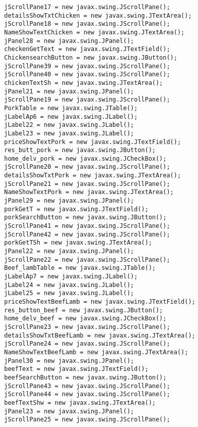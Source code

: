 \documentclass[12pt,a4paper]{article}
\begin{document}
\begin{lstlisting}
        jScrollPane17 = new javax.swing.JScrollPane();
        detailsShowTxtChicken = new javax.swing.JTextArea();
        jScrollPane18 = new javax.swing.JScrollPane();
        NameShowTextChicken = new javax.swing.JTextArea();
        jPanel28 = new javax.swing.JPanel();
        checkenGetText = new javax.swing.JTextField();
        ChickensearchButton = new javax.swing.JButton();
        jScrollPane39 = new javax.swing.JScrollPane();
        jScrollPane40 = new javax.swing.JScrollPane();
        chickenTextSh = new javax.swing.JTextArea();
        jPanel21 = new javax.swing.JPanel();
        jScrollPane19 = new javax.swing.JScrollPane();
        PorkTable = new javax.swing.JTable();
        jLabelAp6 = new javax.swing.JLabel();
        jLabel22 = new javax.swing.JLabel();
        jLabel23 = new javax.swing.JLabel();
        priceShowTextPork = new javax.swing.JTextField();
        res_butt_pork = new javax.swing.JButton();
        home_delv_pork = new javax.swing.JCheckBox();
        jScrollPane20 = new javax.swing.JScrollPane();
        detailsShowTxtPork = new javax.swing.JTextArea();
        jScrollPane21 = new javax.swing.JScrollPane();
        NameShowTextPork = new javax.swing.JTextArea();
        jPanel29 = new javax.swing.JPanel();
        porkGetT = new javax.swing.JTextField();
        porkSearchButton = new javax.swing.JButton();
        jScrollPane41 = new javax.swing.JScrollPane();
        jScrollPane42 = new javax.swing.JScrollPane();
        porkGetTSh = new javax.swing.JTextArea();
        jPanel22 = new javax.swing.JPanel();
        jScrollPane22 = new javax.swing.JScrollPane();
        Beef_lambTable = new javax.swing.JTable();
        jLabelAp7 = new javax.swing.JLabel();
        jLabel24 = new javax.swing.JLabel();
        jLabel25 = new javax.swing.JLabel();
        priceShowTextBeefLamb = new javax.swing.JTextField();
        res_button_beef = new javax.swing.JButton();
        home_delv_beef = new javax.swing.JCheckBox();
        jScrollPane23 = new javax.swing.JScrollPane();
        detailsShowTxtBeefLamb = new javax.swing.JTextArea();
        jScrollPane24 = new javax.swing.JScrollPane();
        NameShowTextBeefLamb = new javax.swing.JTextArea();
        jPanel30 = new javax.swing.JPanel();
        beefText = new javax.swing.JTextField();
        beefSearchButton = new javax.swing.JButton();
        jScrollPane43 = new javax.swing.JScrollPane();
        jScrollPane44 = new javax.swing.JScrollPane();
        beefTextShw = new javax.swing.JTextArea();
        jPanel23 = new javax.swing.JPanel();
        jScrollPane25 = new javax.swing.JScrollPane();

\end{lstlisting}
\end{document}
